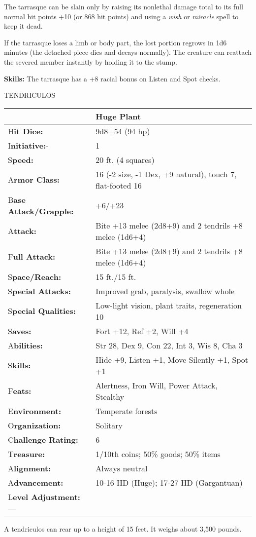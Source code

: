 \documentclass{article}
\begin{document}
The tarrasque can be slain only by raising its nonlethal damage total to its full 
normal hit points +10 (or 868 hit points) and using a \textit{wish }or \textit{miracle 
}spell to keep it dead.

If the tarrasque loses a limb or body part, the lost portion regrows in 1d6 minutes 
(the detached piece dies and decays normally). The creature can reattach the severed 
member instantly by holding it to the stump.

\textbf{Skills:} The tarrasque has a +8 racial bonus on Listen and Spot checks.

\vspace{12pt}
{\LARGE{}TENDRICULOS}

\begin{tabular}{|>{\raggedright}p{91pt}|>{\raggedright}p{226pt}|}
\hline
  & Huge Plant\tabularnewline
\hline
H\textbf{it Dice:} & 9d8+54 (94 hp)\tabularnewline
\hline
I\textbf{nitiative:}- & 1\tabularnewline
\hline
S\textbf{peed:} & 20 ft. (4 squares)\tabularnewline
\hline
A\textbf{rmor Class:} & 16 (-2 size, -1 Dex, +9 natural), touch 7, flat-footed 
16\tabularnewline
\hline
B\textbf{ase Attack/Grapple:} & +6/+23\tabularnewline
\hline
A\textbf{ttack:} & Bite +13 melee (2d8+9) and 2 tendrils +8 melee (1d6+4)\tabularnewline
\hline
F\textbf{ull Attack:} & Bite +13 melee (2d8+9) and 2 tendrils +8 melee (1d6+4)\tabularnewline
\hline
S\textbf{pace/Reach:} & 15 ft./15 ft.\tabularnewline
\hline
S\textbf{pecial Attacks:} & Improved grab, paralysis, swallow whole\tabularnewline
\hline
S\textbf{pecial Qualities:} & Low-light vision, plant traits, regeneration 10\tabularnewline
\hline
S\textbf{aves:} & Fort +12, Ref +2, Will +4\tabularnewline
\hline
A\textbf{bilities:} & Str 28, Dex 9, Con 22, Int 3, Wis 8, Cha 3\tabularnewline
\hline
S\textbf{kills:} & Hide +9, Listen +1, Move Silently +1, Spot +1\tabularnewline
\hline
F\textbf{eats:} & Alertness, Iron Will, Power Attack, Stealthy\tabularnewline
\hline
E\textbf{nvironment:} & Temperate forests\tabularnewline
\hline
O\textbf{rganization:} & Solitary\tabularnewline
\hline
C\textbf{hallenge Rating:} & 6\tabularnewline
\hline
T\textbf{reasure:} & 1/10th coins; 50\% goods; 50\% items\tabularnewline
\hline
A\textbf{lignment:} & Always neutral\tabularnewline
\hline
A\textbf{dvancement:} & 10-16 HD (Huge); 17-27 HD (Gargantuan)\tabularnewline
\hline
L\textbf{evel Adjustment:}--- & \tabularnewline
\hline
\end{tabular}

A tendriculos can rear up to a height of 15 feet. It weighs about 3,500 pounds.
\end{document}
